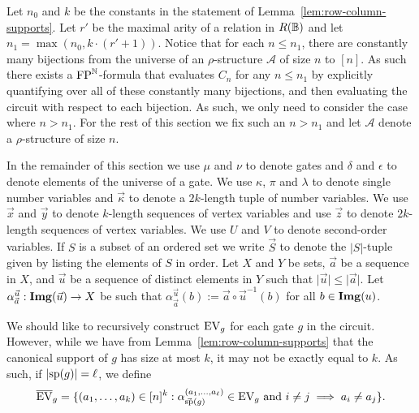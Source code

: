\documentclass[../main/thesis.tex]{subfiles}
\begin{document}
Let $n_0$ and $k$ be the constants in the statement of
Lemma~\ref{lem:row-column-supports}. Let $r'$ be the maximal arity of a relation
in $R(\mathbb{B})$ and let $n_1 = \max(n_0, k \cdot (r' + 1))$. Notice that for each $n
\leq n_1$, there are constantly many bijections from the universe of an
$\rho$-structure $\mathcal{A}$ of size $n$ to $[n]$. As such there exists a
$\text{\upshape FP}^{\mathbb{N}}$-formula that evaluates $C_n$ for any $n \leq n_1$ by explicitly
quantifying over all of these constantly many bijections, and then evaluating
the circuit with respect to each bijection. As such, we only need to consider
the case where $n > n_1$. For the rest of this section we fix such an $n > n_1$
and let $\mathcal{A}$ denote a $\rho$-structure of size $n$.

In the remainder of this section we use $\mu$ and $\nu$ to denote gates and
$\delta$ and $\epsilon$ to denote elements of the universe of a gate. We use
$\kappa$, $\pi$ and $\lambda$ to denote single number variables and
$\vec{\kappa}$ to denote a $2k$-length tuple of number variables. We use
$\vec{x}$ and $\vec{y}$ to denote $k$-length sequences of vertex variables and
use $\vec{z}$ to denote $2k$-length sequences of vertex variables. We use $U$
and $V$ to denote second-order variables. If $S$ is a subset of an ordered set
we write $\vec{S}$ to denote the $\vert S \vert$-tuple given by listing the
elements of $S$ in order. Let $X$ and $Y$ be sets, $\vec{a}$ be a sequence in
$X$, and $\vec{u}$ be a sequence of distinct elements in $Y$ such that $\vert
\vec{u} \vert \leq \vert \vec{a} \vert$. Let $\alpha^{\vec{u}}_{\vec{a}}: \text{\textbf{Img}}
(\vec{u}) \rightarrow X$ be such that $\alpha^{\vec{u}}_{\vec{a}}(b) := \vec{a} \circ
\vec{u}^{-1}(b)$ for all $b \in \text{\textbf{Img}}(u)$.

We should like to recursively construct $\text{EV}_g$ for each gate $g$ in the
circuit. However, while we have from Lemma~\ref{lem:row-column-supports} that
the canonical support of $g$ has size at most $k$, it may not be exactly equal
to $k$. As such, if $\vert \text{sp}(g) \vert = \ell$, we define
\begin{align*}
	\overline{\text{EV}}_g = \{ (a_1, \ldots , a_k) \in [n]^k : \alpha^{(a_1 , \ldots , a_\ell)}_{\vec{\text{sp}}(g)} \in \text{EV}_g \text{ and } i \neq j \implies a_i \neq a_j \}. 
\end{align*}
\end{document}
